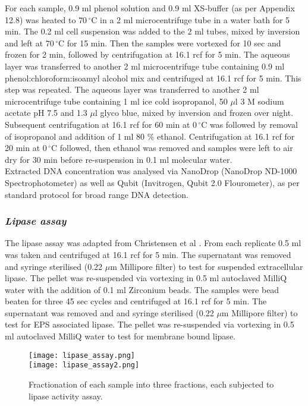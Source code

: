 \documentclass{article}
\begin{document}
For each sample, 0.9 ml phenol solution and 0.9 ml XS-buffer (as per Appendix 12.8) was  heated to $70\,^{\circ}\mathrm{C}$ in a 2 ml microcentrifuge tube in a water bath for 5 min. The 0.2 ml cell suspension was added to the 2 ml tubes, mixed by inversion and left at $70\,^{\circ}\mathrm{C}$ for 15 min. Then the samples were vortexed for 10 sec and frozen for 2 min, followed by centrifugation at 16.1 rcf for 5 min. The aqueous layer was transferred to another 2 ml microcentrifuge tube containing 0.9 ml phenol:chloroform:isoamyl alcohol mix and centrifuged at 16.1 rcf for 5 min. This step was repeated. The aqueous layer was transferred to another 2 ml microcentrifuge tube containing 1 ml ice cold isopropanol, 50 $\mu$l 3 M sodium acetate pH 7.5 and 1.3 $\mu$l glyco blue, mixed by inversion and frozen over night. Subsequent centrifugation at 16.1 rcf for 60 min at $0\,^{\circ}\mathrm{C}$ was followed by removal of isopropanol and addition of 1 ml 80 \% ethanol. Centrifugation at 16.1 rcf for 20 min at $0\,^{\circ}\mathrm{C}$ followed, then ethanol was removed and samples were left to air dry for 30 min before re-suspension in 0.1 ml molecular water.
\\ 
Extracted DNA concentration was analysed via NanoDrop (NanoDrop ND-1000 Spectrophotometer) as well as Qubit (Invitrogen, Qubit 2.0 Flourometer), as per standard protocol for broad range DNA detection.

\subsubsection{\emph{Lipase assay}}
The lipase assay was adapted from Christensen et al \cite{christensen_03}. From each replicate 0.5 ml was taken and centrifuged at 16.1 rcf for 5 min. The supernatant was removed and syringe sterilised (0.22 $\mu$m Millipore filter) to test for suspended extracellular lipase.
The pellet was re-suspended via vortexing in 0.5 ml autoclaved MilliQ water with the addition of 0.1 ml Zirconium beads. The samples were bead beaten for three 45 sec cycles and centrifuged at 16.1 rcf for 5 min. The supernatant was removed and and syringe sterilised (0.22 $\mu$m Millipore filter) to test for EPS associated lipase.
The pellet was re-suspended via vortexing in 0.5 ml autoclaved MilliQ water to test for membrane bound lipase.


\begin{figure}
\begin{center}
\texttt{[image: lipase\_assay.png]}\\
\texttt{[image: lipase\_assay2.png]}
\caption{Fractionation of each sample into three fractions, each subjected to lipase activity assay.}
\end{center}
\end{figure}
\end{document}
